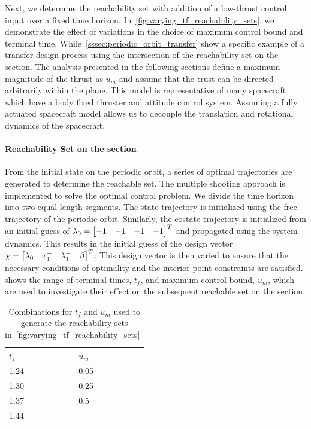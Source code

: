 Next, we determine the reachability set with addition of a low-thrust control input over a fixed time horizon.
In~\cref{fig:varying_tf_reachability_sets}, we demonstrate the effect of variations in the choice of maximum control bound and terminal time.
While~\cref{sssec:periodic_orbit_transfer} show a specific example of a transfer design process using the intersection of the reachability set on the \Poincare section.
The analysis presented in the following sections define a maximum magnitude of the thrust as \( u_{m} \) and assume that the trust can be directed arbitrarily within the plane. 
This model is representative of many spacecraft which have a body fixed thruster and attitude control system.
Assuming a fully actuated spacecraft model allows us to decouple the translation and rotational dynamics of the spacecraft.

\paragraph{Reachability Set on the \Poincare section}
From the initial state on the periodic orbit, a series of optimal trajectories are generated to determine the reachable set.
The multiple shooting approach is implemented to solve the optimal control problem. 
We divide the time horizon into two equal length segments. 
The state trajectory is initialized using the free trajectory of the periodic orbit. 
Similarly, the costate trajectory is initialized from an initial guess of \( \lambda_0 = \begin{bmatrix} -1 & -1 & -1 & -1\end{bmatrix}^T\) and propagated using the system dynamics.
This results in the initial guess of the design vector \( \chi = \begin{bmatrix} \lambda_0 & x_1^{-} & \lambda_1^{-} & \beta \end{bmatrix}^T\).
This design vector is then varied to ensure that the necessary conditions of optimality and the interior point constraints are satisfied. 
 shows the range of terminal times, \( t_f \), and maximum control bound, \( u_m \), which are used to investigate their effect on the subsequent reachable set on the \Poincare section.

\begin{table}[htbp]
    \centering
    \begin{tabular}{ll}  
        \toprule
        \(t_f\) & \( u_m \) \\
        \midrule
        1.24 & 0.05 \\
        1.30 & 0.25 \\
        1.37 & 0.5 \\
        1.44 & \\
        \bottomrule
    \end{tabular}
    \caption{Combinations for \( t_f \) and \( u_m\) used to generate the reachability sets in~\cref{fig:varying_tf_reachability_sets}~\label{tab:varying_tf}}
\end{table}

